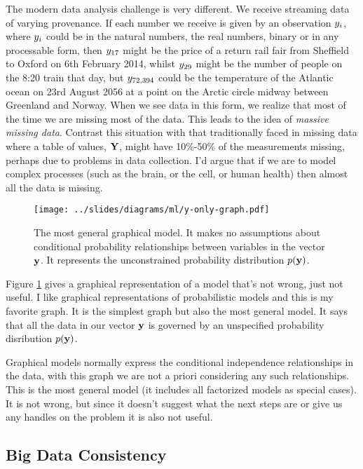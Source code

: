 \documentclass[a4paperpaper,]{article}
\begin{document}
The modern data analysis challenge is very different. We receive
streaming data of varying provenance. If each number we receive is given
by an observation \(y_i\), where \(y_i\) could be in
the natural numbers, the real numbers, binary or in any processable
form, then \(y_{17}\) might be the price of a return rail fair
from Sheffield to Oxford on 6th February 2014, whilst
\(y_{29}\) might be the number of people on the 8:20 train
that day, but \(y_{72,394}\) could be the temperature of the
Atlantic ocean on 23rd August 2056 at a point on the Arctic circle
midway between Greenland and Norway. When we see data in this form, we
realize that most of the time we are missing most of the data. This
leads to the idea of \emph{massive missing data}. Contrast this
situation with that traditionally faced in missing data where a table of
values, \(\mathbf{Y}\), might have 10\%-50\% of the measurements
missing, perhaps due to problems in data collection. I'd argue that if
we are to model complex processes (such as the brain, or the cell, or
human health) then almost all the data is missing.

\begin{figure}[htb]
\texttt{[image: ../slides/diagrams/ml/y-only-graph.pdf]}


\caption{The most general graphical model. It makes no assumptions about conditional probability relationships between variables in the vector $\mathbf{ y}$. It represents the unconstrained probability distribution $p(\mathbf{ y})$.}
\label{y-only-graph}
\end{figure}

Figure \ref{y-only-graph} gives a graphical representation of a model
that's not wrong, just not useful. I like graphical representations of
probabilistic models and this is my favorite graph. It is the simplest
graph but also the most general model. It says that all the data in our
vector \(\mathbf{ y}\) is governed by an unspecified probability
disribution \(p(\mathbf{ y})\).

Graphical models normally express the conditional independence
relationships in the data, with this graph we are not a priori
considering any such relationships. This is the most general model (it
includes all factorized models as special cases). It is not wrong, but
since it doesn't suggest what the next steps are or give us any handles
on the problem it is also not useful.

\hypertarget{big-data-consistency}{%
\subsection{Big Data Consistency}\label{big-data-consistency}}
\end{document}
